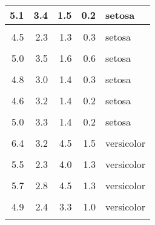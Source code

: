 \documentclass[
]{article}
\begin{document}
\begin{table}
\begin{tabular}[t]{r|r|r|r|l}
\hline
5.1 & 3.4 & 1.5 & 0.2 & setosa\\
\hline
\cellcolor{gray!6}{5.0} & \cellcolor{gray!6}{3.5} & \cellcolor{gray!6}{1.3} & \cellcolor{gray!6}{0.3} & \cellcolor{gray!6}{setosa}\\
\hline
4.5 & 2.3 & 1.3 & 0.3 & setosa\\
\hline
\cellcolor{gray!6}{4.4} & \cellcolor{gray!6}{3.2} & \cellcolor{gray!6}{1.3} & \cellcolor{gray!6}{0.2} & \cellcolor{gray!6}{setosa}\\
\hline
5.0 & 3.5 & 1.6 & 0.6 & setosa\\
\hline
\cellcolor{gray!6}{5.1} & \cellcolor{gray!6}{3.8} & \cellcolor{gray!6}{1.9} & \cellcolor{gray!6}{0.4} & \cellcolor{gray!6}{setosa}\\
\hline
4.8 & 3.0 & 1.4 & 0.3 & setosa\\
\hline
\cellcolor{gray!6}{5.1} & \cellcolor{gray!6}{3.8} & \cellcolor{gray!6}{1.6} & \cellcolor{gray!6}{0.2} & \cellcolor{gray!6}{setosa}\\
\hline
4.6 & 3.2 & 1.4 & 0.2 & setosa\\
\hline
\cellcolor{gray!6}{5.3} & \cellcolor{gray!6}{3.7} & \cellcolor{gray!6}{1.5} & \cellcolor{gray!6}{0.2} & \cellcolor{gray!6}{setosa}\\
\hline
5.0 & 3.3 & 1.4 & 0.2 & setosa\\
\hline
\cellcolor{gray!6}{7.0} & \cellcolor{gray!6}{3.2} & \cellcolor{gray!6}{4.7} & \cellcolor{gray!6}{1.4} & \cellcolor{gray!6}{versicolor}\\
\hline
6.4 & 3.2 & 4.5 & 1.5 & versicolor\\
\hline
\cellcolor{gray!6}{6.9} & \cellcolor{gray!6}{3.1} & \cellcolor{gray!6}{4.9} & \cellcolor{gray!6}{1.5} & \cellcolor{gray!6}{versicolor}\\
\hline
5.5 & 2.3 & 4.0 & 1.3 & versicolor\\
\hline
\cellcolor{gray!6}{6.5} & \cellcolor{gray!6}{2.8} & \cellcolor{gray!6}{4.6} & \cellcolor{gray!6}{1.5} & \cellcolor{gray!6}{versicolor}\\
\hline
5.7 & 2.8 & 4.5 & 1.3 & versicolor\\
\hline
\cellcolor{gray!6}{6.3} & \cellcolor{gray!6}{3.3} & \cellcolor{gray!6}{4.7} & \cellcolor{gray!6}{1.6} & \cellcolor{gray!6}{versicolor}\\
\hline
4.9 & 2.4 & 3.3 & 1.0 & versicolor\\
\hline
\cellcolor{gray!6}{6.6} & \cellcolor{gray!6}{2.9} & \cellcolor{gray!6}{4.6} & \cellcolor{gray!6}{1.3} & \cellcolor{gray!6}{versicolor}\\

\end{tabular}
\end{table}
\end{document}
